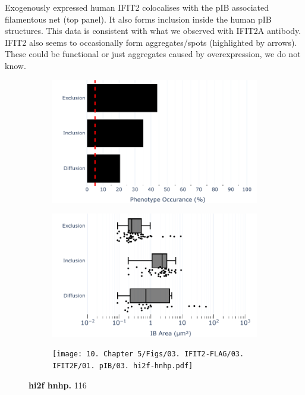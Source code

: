 Exogenously expressed human IFIT2 colocalises with the pIB associated filamentous net (top panel). It also forms inclusion inside the human pIB structures. This data is consistent with what we observed with IFIT2A antibody. IFIT2 also seems to occasionally form aggregates/spots (highlighted by arrows). These could be functional or just aggregates caused by overexpression, we do not know.

\begin{figure}
    \begin{subfigure}{0.495\textwidth}
        \caption{}
        \includegraphics[width=1\linewidth]{10. Chapter 5/Figs/03. IFIT2-FLAG/03. IFIT2F/01. pIB/01. bar_hi2f_hnhp.pdf} 
    \end{subfigure}
    \begin{subfigure}{0.495\textwidth}
        \caption{}
        \includegraphics[width=1\linewidth]{10. Chapter 5/Figs/03. IFIT2-FLAG/03. IFIT2F/01. pIB/02. box_hi2f_hnhp.pdf}
    \end{subfigure}
    \begin{subfigure}{1\textwidth}
        \centering
        \caption{}
        \texttt{[image: 10. Chapter 5/Figs/03. IFIT2-FLAG/03. IFIT2F/01. pIB/03. hi2f-hnhp.pdf]}
    \end{subfigure}
    \caption[hi2f hnhp]{\textbf{hi2f hnhp.} 116}
    \label{fig:hi2f hnhp}
\end{figure}

